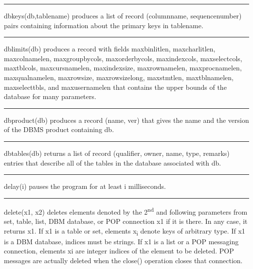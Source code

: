 \bigskip\hrule\vspace{0.1cm}

\noindent
{}dbkeys(db,tablename) produces a list of record
(columnname, sequencenumber) pairs containing information about the
primary keys in tablename.

\bigskip\hrule\vspace{0.1cm}

\noindent
dblimits(db) produces a record with fields \textsf{maxbinlitlen,
maxcharlitlen, maxcolnamelen, maxgroupbycols, maxorderbycols,
maxindexcols, maxselectcols, maxtblcols, maxcursnamelen, maxindexsize,
maxrownamelen, maxprocnamelen, maxqualnamelen, maxrowsize,
maxrowsizelong, maxstmtlen, maxtblnamelen, maxselecttbls,} and\textsf{
maxusernamelen} that contains the upper bounds of the database for many
parameters.

\bigskip\hrule\vspace{0.1cm}

\noindent
dbproduct(db) produces a record (name, ver) that gives the name and the
version of the DBMS product containing db.

\bigskip\hrule\vspace{0.1cm}

\noindent
dbtables(db) returns a list of record (qualifier, owner, name, type,
remarks) entries that describe all of the tables in the database
associated with db.

\bigskip\hrule\vspace{0.1cm}

\noindent
{}delay(i) pauses the program for at least i milliseconds.

\bigskip\hrule\vspace{0.1cm}

\noindent
{}delete(x1, x2) deletes elements denoted by the
2\textsuperscript{nd} and following parameters from set, table, list,
DBM database, or POP connection x1 if it is there. In any case, it
returns x1. If x1 is a table or set, elements x\textsubscript{i} denote
keys of arbitrary type. If x1 is a DBM database, indices must be
strings. If x1 is a list or a POP messaging connection, elements xi are
integer indices of the element to be deleted. POP messages are actually
deleted when the close() operation closes that connection.

